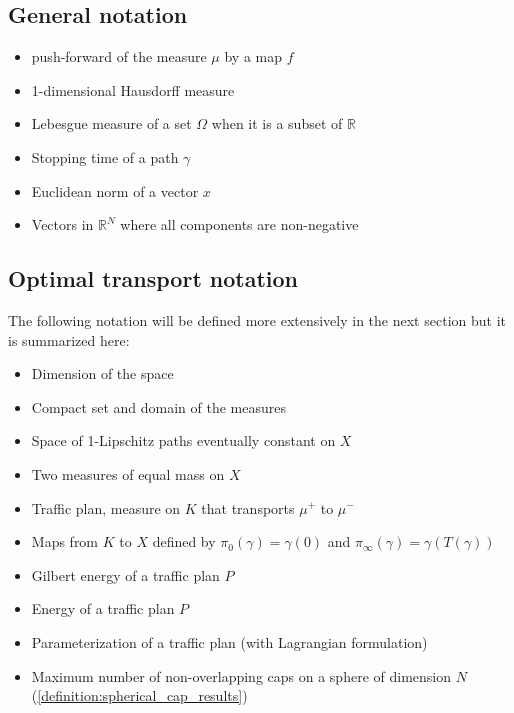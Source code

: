 \documentclass[12pt,a4paper]{article}
\newenvironment{itemizeb}
{\begin{itemize}
     \itemsep=2pt}{
\end{itemize}}
\numberwithin{equation}{section}
\theoremstyle{mytheorem}
\theoremstyle{myremark}
\theoremstyle{myparagraph}
\newcommand{\R}{\mathbb{R}}
\begin{document}
    \subsection*{General notation}

    \begin{itemizeb}
         cm=.3 cm
        \item[$f_{\#}\mu$] push-forward of the measure $\mu$ by a map $f$
        \item[$\mathcal{H}^1$] 1-dimensional Hausdorff measure
        \item[$|\Omega|$] Lebesgue measure of a set $\Omega$ when it is a subset of $\R$
        \item[$T(\gamma)$] Stopping time of a path $\gamma$
        \item[$\|x\|$] Euclidean norm of a vector $x$
        \item[$\R_+^N$] Vectors in $\R^N$ where all components are non-negative
    \end{itemizeb}

    \subsection*{Optimal transport notation}
    The following notation will be defined more extensively in the next section but it is summarized here:

    \begin{itemizeb}
         cm=.3 cm
        \item[$N$] Dimension of the space
        \item[$X \subseteq \R^N$] Compact set and domain of the measures
        \item[$K$] Space of 1-Lipschitz paths eventually constant on $X$
        \item[$\mu^+, \mu^-$] Two measures of equal mass on $X$
        \item[$\mathbf{P}$] Traffic plan, measure on $K$ that transports $\mu^+$ to $\mu^-$
        \item[$\pi_0, \pi_\infty$] Maps from $K$ to $X$ defined by $\pi_0(\gamma) = \gamma(0)$ and $\pi_\infty(\gamma) = \gamma(T(\gamma))$
        \item[$\mathcal{E}^{\alpha}(P)$] Gilbert energy of a traffic plan $P$
        \item[$E^{\alpha}(P)$] Energy of a traffic plan $P$
        \item[$\chi$] Parameterization of a traffic plan (with Lagrangian formulation)
        \item[$C(\beta, N)$] Maximum number of non-overlapping caps on a sphere of dimension $N$ (\ref{definition:spherical_cap_results})
    \end{itemizeb}
\end{document}
